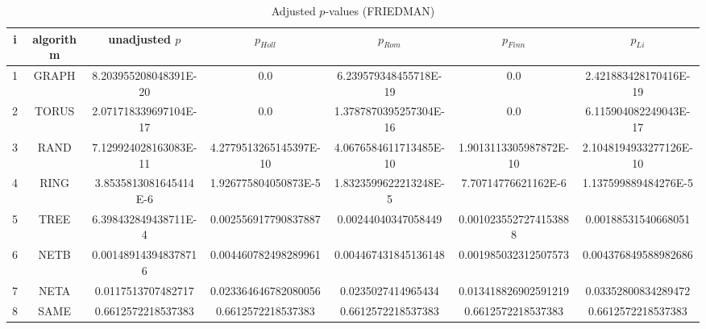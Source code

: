 \documentclass[a4paper,10pt]{article}
\begin{document}
\begin{landscape}
\begin{table}[!htp]
\centering\scriptsize
\caption{Adjusted $p$-values (FRIEDMAN)}
\begin{tabular}{ccccccc}
i&algorithm&unadjusted $p$&$p_{Holl}$&$p_{Rom}$&$p_{Finn}$&$p_{Li}$\\
\hline
1& GRAPH&8.203955208048391E-20&0.0&6.239579348455718E-19&0.0&2.421883428170416E-19\\
2& TORUS&2.071718339697104E-17&0.0&1.3787870395257304E-16&0.0&6.115904082249043E-17\\
3& RAND&7.129924028163083E-11&4.2779513265145397E-10&4.0676584611713485E-10&1.9013113305987872E-10&2.1048194933277126E-10\\
4& RING&3.8535813081645414E-6&1.926775804050873E-5&1.8323599622213248E-5&7.70714776621162E-6&1.137599889484276E-5\\
5& TREE&6.398432849438711E-4&0.002556917790837887&0.00244040347058449&0.0010235527274153888&0.00188531540668051\\
6& NETB&0.001489143948378716&0.004460782498289961&0.004467431845136148&0.001985032312507573&0.004376849588982686\\
7& NETA&0.0117513707482717&0.023364646782080056&0.0235027414965434&0.013418826902591219&0.03352800834289472\\
8& SAME&0.6612572218537383&0.6612572218537383&0.6612572218537383&0.6612572218537383&0.6612572218537383\\
\hline
\end{tabular}
\end{table}


\newpage


\end{landscape}
\end{document}

